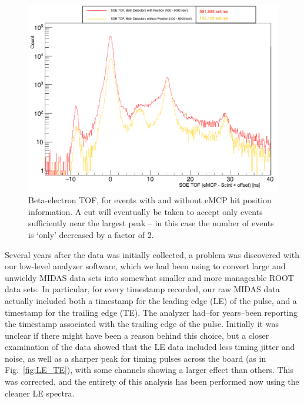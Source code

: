 \begin{figure}[h!!!!t!]
	\centering
	\includegraphics[width=.999\linewidth]
	{Figures/SOE_TOF_positioncompare.pdf}
	\caption{Beta-electron TOF, for events with and without eMCP hit position information.  A cut will eventually be taken to accept only events sufficiently near the largest peak -- in this case the number of events is `only' decreased by a factor of 2.}	
	\label{fig:soe_tof_positioncompare}
\end{figure}

Several years after the data was initially collected, a problem was discovered with our low-level analyzer software, which we had been using to convert large and unwieldy MIDAS data sets into somewhat smaller and more manageable ROOT data sets.  In particular, for every timestamp recorded, our raw MIDAS data actually included both a timestamp for the leading edge (LE) of the pulse, and a timestamp for the trailing edge (TE).  The analyzer had--for years--been reporting the timestamp associated with the trailing edge of the pulse.  Initially it was unclear if there might have been a reason behind this choice, but a closer examination of the data showed that the LE data included less timing jitter and noise, as well as a sharper peak for timing pulses across the board (as in Fig.~\ref{fig:LE_TE}), with some channels showing a larger effect than others.  This was corrected, and the entirety of this analysis has been performed now using the cleaner LE spectra.  


